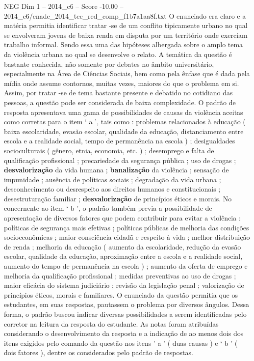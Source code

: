 \begin{textsample}{NEG Dim 1 – 2014\_c6 – Score -10.00 – 2014\_c6/enade\_2014\_tec\_red\_comp\_f1b7a1aa8f.txt}
O enunciado era claro e a matéria permitia identificar tratar -se de um conflito tipicamente urbano no qual se envolveram jovens de baixa renda em disputa por um território onde exerciam trabalho informal.
Sendo essa uma das hipóteses albergada sobre o amplo tema da violência urbana no qual se desenvolve o relato.
A temática da questão é bastante conhecida, não somente por debates no âmbito universitário, especialmente na Área de Ciências Sociais, bem como pela ênfase que é dada pela mídia onde assume contornos, muitas vezes, maiores do que o problema em si.
Assim, por tratar -se de tema bastante presente e debatido no cotidiano das pessoas, a questão pode ser considerada de baixa complexidade.
O padrão de resposta apresentava uma gama de possibilidades de causas da violência aceitas como corretas para o item ‘ a ’, tais como : problemas relacionados à educação ( baixa escolaridade, evasão escolar, qualidade da educação, distanciamento entre escola e a realidade social, tempo de permanência na escola ) ; desigualdades socioculturais ( gênero, etnia, economia, etc. ) ; desemprego e falta de qualificação profissional ; precariedade da segurança pública ; uso de drogas ; \textbf{desvalorização} da vida humana ; \textbf{banalização} da violência ; sensação de impunidade ; ausência de políticas sociais ; degradação da vida urbana ; desconhecimento ou desrespeito aos direitos humanos e constitucionais ; desestruturação familiar ; \textbf{desvalorização} de princípios éticos e morais.
No concernente ao item ‘ b ’, o padrão também previa a possibilidade de apresentação de diversos fatores que podem contribuir para evitar a violência : políticas de segurança mais efetivas ; políticas públicas de melhoria das condições socioeconômicas ; maior consciência cidadã e respeito à vida ; melhor distribuição de renda ; melhoria da educação ( aumento da escolaridade, redução da evasão escolar, qualidade da educação, aproximação entre a escola e a realidade social, aumento do tempo de permanência na escola ) ; aumento da oferta de emprego e melhoria da qualificação profissional ; medidas preventivas ao uso de drogas ; maior eficácia do sistema judiciário ; revisão da legislação penal ; valorização de princípios éticos, morais e familiares.
O enunciado da questão permitia que os estudantes, em suas respostas, pautassem o problema por diversos ângulos.
Dessa forma, o padrão buscou indicar diversas possibilidades a serem identificadas pelo corretor na leitura da resposta do estudante.
As notas foram atribuídas considerando o desenvolvimento da resposta e a indicação de ao menos dois dos itens exigidos pelo comando da questão nos itens ’ a ’ ( duas causas ) e ‘ b ’ ( dois fatores ), dentre os considerados pelo padrão de respostas.

\end{textsample}
